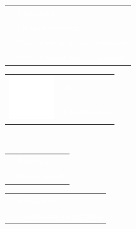 \documentclass[letterpaper]{article}
\begin{document}
\begin{minipage}{1.\linewidth}
{\begin{minipage}{0.47\linewidth}
\begin{minipage}{1\linewidth}
\begin{minipage}{0.47\linewidth}
\begin{tabularx}{1\textwidth}{rX}
			\end{tabularx}
			\vspace{1ex}
			\begin{minipage}{1\linewidth}
				\textcolor{white}{\small
				\begin{tabularx}{1\textwidth}{cX}
					& Clustering\\
					& Feature selection\\
					& Dimension reduction methods\\
					& Matrix factorization methods\\
				\end{tabularx}
				} 
			\end{minipage}
			\vspace{2ex}
		\end{minipage}
		\hfill
		\begin{minipage}{0.47\linewidth}
			\begin{tabularx}{1\textwidth}{rX}
				\multirow{2}{*}{\includegraphics[width=0.1\linewidth]{visualize.eps}}
				 & \large\textmd{\textcolor{white}{Data}}\\
				 & \large\textmd{\textcolor{white}{Visualization}}\\
			\end{tabularx}
		\vspace{1ex}
		\end{minipage}		
	\end{minipage}\\
	\begin{minipage}{1\linewidth} %
		\begin{minipage}{0.47\linewidth}
			\begin{minipage}{1\linewidth}
				\begin{tabularx}{1\textwidth}{rX}
					& \large\textmd{\textcolor{white}{Software}}\\
					& \large\textmd{\textcolor{white}{Development}}\\
				\end{tabularx}
			\end{minipage}
			\begin{minipage}{1\linewidth}
				{\small
				\begin{tabularx}{1\textwidth}{rX}
					& \textcolor{white}{Versioning}\\
				 	& \textcolor{white}{Continuous integration}\\

\end{tabularx}}
\end{minipage}
\end{minipage}
\end{minipage}
\end{minipage}}
\end{minipage}
\end{document}

